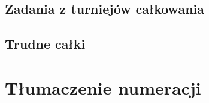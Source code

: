 \documentclass[9pt, twoside, a5paper, fleqn]{extbook}
\theoremstyle{remark}
\begin{document}
\section{Zadania z turniejów całkowania}
	



\section{Trudne całki}
	
	
	

\chapter{Tłumaczenie numeracji}


\printindex

\printindex[persons]

\raggedright
{}

\end{document}
